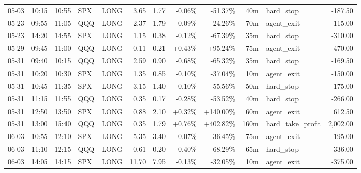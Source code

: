 \documentclass[11pt,a4paper,twoside]{article}
\begin{document}
\begin{center}
\begin{longtable}{>{\color{txtmain}}l l l l l r r r r r >{\color{txtmain}}l r}
05-03 & 10:15 & 10:55 & SPX & LONG & 3.65 & 1.77 & \textcolor{lossred}{-0.06\%} & \textcolor{lossred}{-51.37\%} & 40m & hard\_stop & \textcolor{lossred}{-187.50} \\
05-23 & 09:55 & 11:05 & QQQ & LONG & 2.37 & 1.79 & \textcolor{lossred}{-0.09\%} & \textcolor{lossred}{-24.26\%} & 70m & agent\_exit & \textcolor{lossred}{-115.00} \\
05-23 & 14:20 & 14:55 & SPX & LONG & 1.15 & 0.38 & \textcolor{lossred}{-0.12\%} & \textcolor{lossred}{-67.39\%} & 35m & hard\_stop & \textcolor{lossred}{-310.00} \\
05-29 & 09:45 & 11:00 & QQQ & LONG & 0.11 & 0.21 & \textcolor{wingreen}{+0.43\%} & \textcolor{wingreen}{+95.24\%} & 75m & agent\_exit & \textcolor{wingreen}{470.00} \\
05-31 & 09:40 & 10:15 & QQQ & LONG & 2.59 & 0.90 & \textcolor{lossred}{-0.68\%} & \textcolor{lossred}{-65.32\%} & 35m & hard\_stop & \textcolor{lossred}{-169.50} \\
05-31 & 10:20 & 10:30 & SPX & LONG & 1.35 & 0.85 & \textcolor{lossred}{-0.10\%} & \textcolor{lossred}{-37.04\%} & 10m & agent\_exit & \textcolor{lossred}{-150.00} \\
05-31 & 10:45 & 11:35 & SPX & LONG & 3.15 & 1.40 & \textcolor{lossred}{-0.10\%} & \textcolor{lossred}{-55.56\%} & 50m & hard\_stop & \textcolor{lossred}{-175.00} \\
05-31 & 11:15 & 11:55 & QQQ & LONG & 0.35 & 0.17 & \textcolor{lossred}{-0.28\%} & \textcolor{lossred}{-53.52\%} & 40m & hard\_stop & \textcolor{lossred}{-266.00} \\
05-31 & 12:50 & 13:50 & SPX & LONG & 0.88 & 2.10 & \textcolor{wingreen}{+0.32\%} & \textcolor{wingreen}{+140.00\%} & 60m & agent\_exit & \textcolor{wingreen}{612.50} \\
05-31 & 13:00 & 15:40 & QQQ & LONG & 0.35 & 1.79 & \textcolor{wingreen}{+0.76\%} & \textcolor{wingreen}{+402.82\%} & 160m & hard\_take\_profit & \textcolor{wingreen}{2,002.00} \\
06-03 & 10:55 & 12:10 & SPX & LONG & 5.35 & 3.40 & \textcolor{lossred}{-0.07\%} & \textcolor{lossred}{-36.45\%} & 75m & agent\_exit & \textcolor{lossred}{-195.00} \\
06-03 & 11:10 & 12:15 & QQQ & LONG & 0.61 & 0.20 & \textcolor{lossred}{-0.40\%} & \textcolor{lossred}{-68.29\%} & 65m & hard\_stop & \textcolor{lossred}{-336.00} \\
06-03 & 14:05 & 14:15 & SPX & LONG & 11.70 & 7.95 & \textcolor{lossred}{-0.13\%} & \textcolor{lossred}{-32.05\%} & 10m & agent\_exit & \textcolor{lossred}{-375.00} \\

\end{longtable}
\end{center}
\end{document}
